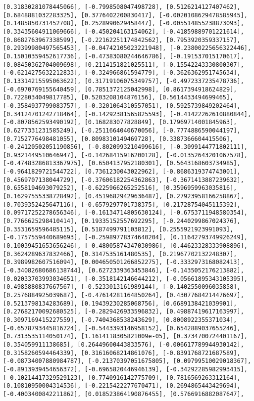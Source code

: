 \documentclass[11pt]{article}
\begin{document}
\begin{Verbatim}[commandchars=\\\{\}]
[0.31830281078445066], [-0.7998508047498728], [0.5126214127407462], [0.6848881032283325], [0.3776402200830417], [-0.0020108629478585945], [0.1485850731452708], [0.2528990629458447], [-0.005514855238873093], [0.33435604911069666], [-0.450204163154062], [-0.41859889701221614], [0.8682763967338599], [-0.22162251174842562], [0.7953920359337157], [0.29399980497565453], [-0.04742105023221948], [-0.23800225656322446], [0.15010359452617736], [-0.47383080244646786], [-0.191537015170617], [0.08450362704009698], [0.2114151821025511], [-0.15542243330800307], [-0.6214275632212833], [-0.324966861594779], [-0.3626362951745634], [0.13314215595063622], [0.31719106075349757], [-0.4972337235478736], [-0.6970769155640459], [0.7851372125042998], [0.8617394918624829], [0.7228034049817785], [0.5203208104876156], [0.5614433494699465], [-0.3584937799083757], [-0.3201064310557051], [0.5925739849202464], [0.34124701242718464], [-0.14292381565825593], [-0.41422262610880844], [-0.8078562593490192], [0.168283077828849], [0.17969714001845963], [0.6277331231585249], [-0.2511664040670056], [-0.7774886590044197], [0.7152776498481055], [0.8098310149469728], [0.3387366604415506], [-0.24120502051190856], [-0.8020993210499616], [-0.3099144771802111], [0.9321449510646947], [-0.14268415916200128], [-0.01352643201067578], [-0.47483286813367975], [0.6504137952180301], [0.5643168603734985], [-0.9641829721544722], [0.7361230043022962], [-0.8686319374743001], [0.4569707138044729], [-0.37606182254362863], [-0.3671413887239632], [0.6558194693079252], [-0.6225966265252516], [0.3596959963035816], [0.16297555338728492], [0.45196829429636487], [0.27923958166258867], [0.7039352425647116], [-0.6579297701738375], [0.21728754045115392], [0.09717252278656346], [-0.16134714805630124], [-0.6753711948580354], [0.7766625298410414], [0.19335152557692295], [-0.2440299867024376], [0.3531659596485115], [0.5187499791103812], [0.2555921923991093], [-0.1757559440689693], [-0.25989778374640204], [0.11642793749926249], [0.10039451653656246], [-0.48005874347030986], [0.44623328333908896], [0.3624289637832466], [0.3147535161480535], [0.21967702132248307], [0.3989982607516094], [0.004650501266852275], [-0.3332973168082413], [-0.34082680686138744], [0.6272339363453846], [-0.1435052176213882], [0.02033703993034651], [-0.3518142146644212], [-0.05661895343105395], [0.4985880837667567], [-0.5233013161989144], [-0.1402550096035858], [0.2576884925039687], [-0.47614281164850264], [0.43077684214476697], [0.5213798134283689], [0.19439230285068756], [0.6689138421039901], [0.27682170092680525], [-0.2829426933596832], [0.49887419617163997], [0.3097169415227559], [-0.7404368538243629], [0.8008922355371034], [-0.6578793445816724], [-0.5443393146958152], [0.6542889037655246], [0.7313535114050174], [1.1614118305821009e-05], [0.3734700724401167], [0.354059911138685], [0.26449600443833576], [-0.006617789944930142], [0.3158260594464339], [0.31616068214861076], [-0.8391768721687589], [-0.08734007880984787], [-0.21370397051675805], [0.09799510029018367], [-0.8913939454656372], [-0.6965820446946139], [-0.34292285982993415], [-0.10214417329529123], [0.7740916142775709], [0.7816569263312164], [0.10810950004314536], [-0.2215422277670471], [0.2694865443429694], [-0.4003400842211862], [0.018523864190876455], [0.5766916882087647], 
\end{Verbatim}
\end{document}
